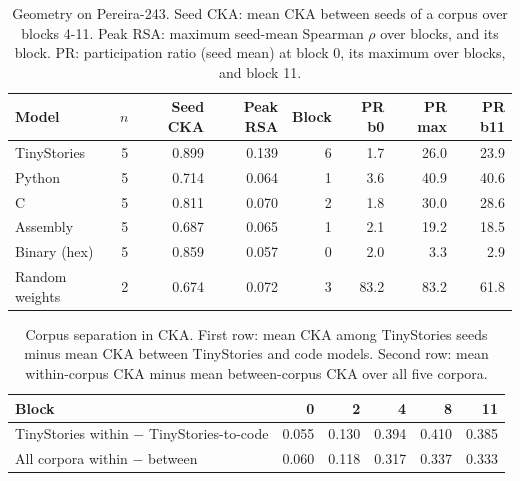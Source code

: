 \documentclass[mlmain]{jmlr}
\begin{document}
\begin{table}[htbp]
  \centering
  \caption{Geometry on Pereira-243. Seed CKA: mean CKA between seeds of a corpus over blocks 4-11. Peak RSA: maximum seed-mean Spearman $\rho$ over blocks, and its block. PR: participation ratio (seed mean) at block 0, its maximum over blocks, and block 11.}
  \label{tab:geometry-summary}
  \small
  \setlength{\tabcolsep}{4pt}
  \begin{tabular}{lrrrrrrr}
\toprule
Model & $n$ & Seed CKA & Peak RSA & Block & PR b0 & PR max & PR b11 \\
\midrule
TinyStories & 5 & 0.899 & 0.139 & 6 & 1.7 & 26.0 & 23.9 \\
Python & 5 & 0.714 & 0.064 & 1 & 3.6 & 40.9 & 40.6 \\
C & 5 & 0.811 & 0.070 & 2 & 1.8 & 30.0 & 28.6 \\
Assembly & 5 & 0.687 & 0.065 & 1 & 2.1 & 19.2 & 18.5 \\
Binary (hex) & 5 & 0.859 & 0.057 & 0 & 2.0 & 3.3 & 2.9 \\
Random weights & 2 & 0.674 & 0.072 & 3 & 83.2 & 83.2 & 61.8 \\
\bottomrule
\end{tabular}
\end{table}

\begin{table}[htbp]
  \centering
  \caption{Corpus separation in CKA. First row: mean CKA among TinyStories seeds minus mean CKA between TinyStories and code models. Second row: mean within-corpus CKA minus mean between-corpus CKA over all five corpora.}
  \label{tab:cka-depth}
  \small
  \begin{tabular}{lrrrrr}
\toprule
Block & 0 & 2 & 4 & 8 & 11 \\
\midrule
TinyStories within $-$ TinyStories-to-code & 0.055 & 0.130 & 0.394 & 0.410 & 0.385 \\
All corpora within $-$ between & 0.060 & 0.118 & 0.317 & 0.337 & 0.333 \\
\bottomrule
\end{tabular}
\end{table}
\end{document}
